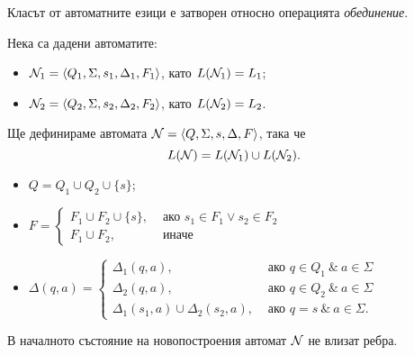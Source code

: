 \begin{lemma}
  \label{lem:union}
  Класът от автоматните езици е затворен относно операцията {\em обединение}.
\end{lemma}
\begin{hint}
  Нека са дадени автоматите:
  \begin{itemize}
  \item 
    $\mathcal{N}_1 = \langle{Q_1,\Sigma,s_1,\Delta_1,F_1}\rangle$, като $L(\mathcal{N}_1) = L_1$;
  \item
    $\mathcal{N}_2=\langle{Q_2,\Sigma,s_2,\Delta_2,F_2}\rangle$, като $L(\mathcal{N}_2) = L_2$.
  \end{itemize}
  Ще дефинираме автомата $\mathcal{N}=\langle{Q,\Sigma,s,\Delta,F}\rangle$, така че
  \[L(\mathcal{N}) = L(\mathcal{N}_1) \cup L(\mathcal{N}_2).\]
  \begin{itemize}
  \item 
    $Q = Q_1 \cup Q_2 \cup \{s\}$;
  \item
    $F = 
    \begin{cases}
      F_1 \cup F_2 \cup \{s\}, & \text{ ако } s_1 \in F_1 \vee s_2 \in F_2\\
      F_1 \cup F_2,            & \text{ иначе } 
    \end{cases}$
  \item
    $
    \Delta(q,a) = 
    \begin{cases}
      \Delta_1(q,a),                       & \text{ ако } q\in Q_1\ \&\ a\in\Sigma\\
      \Delta_2(q,a),                       & \text{ ако } q\in Q_2\ \&\  a\in\Sigma\\
      \Delta_1(s_1,a) \cup \Delta_2(s_2,a), & \text{ ако } q = s\ \&\  a \in\Sigma.
    \end{cases}
    $
  \end{itemize}
\end{hint}
\begin{remark}
  В началното състояние на новопостроения автомат $\mathcal{N}$ не влизат ребра.
\end{remark}


